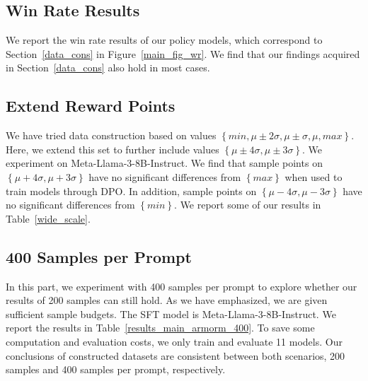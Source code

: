 \subsection{Win Rate Results}
\label{wr}

We report the win rate results of our policy models, which correspond to Section~\ref{data_cons} in Figure~\ref{main_fig_wr}. We find that our findings acquired in Section~\ref{data_cons} also hold in most cases.



\subsection{Extend Reward Points}
\label{appendix_extend}

We have tried data construction based on values $\left\{min, \mu \pm 2\sigma, \mu\pm\sigma, \mu, max\right\}$.
Here, we extend this set to further include values $\left\{\mu \pm 4\sigma, \mu \pm 3\sigma\right\}$. 
We experiment on Meta-Llama-3-8B-Instruct. 
We find that sample points on $\left\{\mu + 4\sigma, \mu + 3\sigma\right\}$ have no significant differences from $\left\{max\right\}$ when used to train models through DPO.
In addition, sample points on $\left\{\mu - 4\sigma, \mu - 3\sigma\right\}$ have no significant differences from $\left\{min\right\}$.
We report some of our results in Table~\ref{wide_scale}.




\subsection{400 Samples per Prompt}
\label{appendix_400}
In this part, we experiment with 400 samples per prompt to explore whether our results of 200 samples can still hold.
As we have emphasized, we are given sufficient sample budgets.
The SFT model is Meta-Llama-3-8B-Instruct.
We report the results in Table~\ref{results_main_armorm_400}.
To save some computation and evaluation costs, we only train and evaluate 11 models.
Our conclusions of constructed datasets are consistent between both scenarios, 200 samples and 400 samples per prompt, respectively.


